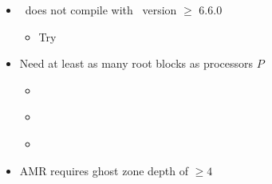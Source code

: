 \begin{frame}[fragile]
\secframetitle{\ssIssues}


\begin{itemize}
  \item \enzopcello\ does not compile with \charm\ version $\ge$ 6.6.0
  \begin{itemize}
  \item \footnotesize Try \href{http://charm.cs.illinois.edu/distrib/charm-6.5.1.tar.gz}{}
  \end{itemize}
  \item Need at least as many root blocks as processors $P$
  \begin{itemize}
    \item {}
    \item[\frownie] \textcolor{red}{ }
    \item[\smiley]\textcolor{green!50!black}{ }
  \end{itemize}
  \item AMR requires ghost zone depth of $\ge 4$
\end{itemize}


\end{frame}
